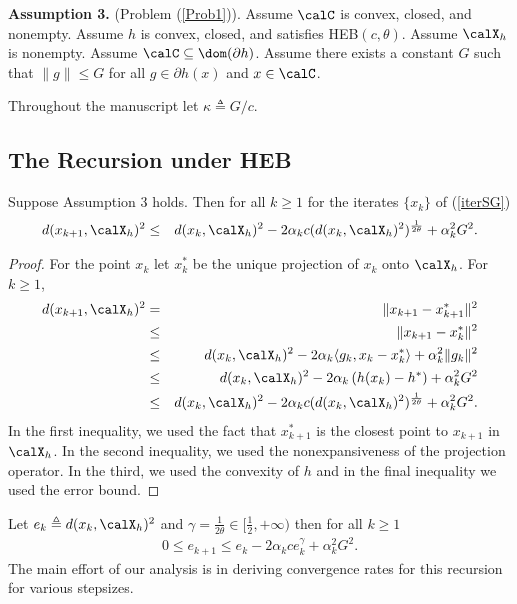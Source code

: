 \documentclass[smallextended]{svjour3}
\begin{document}
{\bf Assumption 3.} (Problem (\ref{Prob1})).
Assume $\calC$ is convex, closed, and nonempty. Assume $h$ is convex, closed, and satisfies HEB$(c,\theta)$. Assume $\calX_h$ is nonempty. Assume $\calC\subseteq\dom(\partial h)$. Assume there exists a constant $G$ such that $\|g\|\leq G$ for all $g\in\partial h(x)$ and $x\in\calC$. 

Throughout the manuscript let $\kappa\triangleq G/c$. 
\subsection{The Recursion under HEB}


 \begin{proposition}\label{Prop_keyRecur}
 Suppose Assumption 3 holds. Then for all $k\geq 1$ for the iterates $\{x_k\}$ of (\ref{iterSG})
 \begin{eqnarray}\label{KeyRecursion}
 d(x_{k+1},\calX_h)^2
 &\leq&
  d(x_k,\calX_h)^2
  -2\alpha_k c(d(x_k,\calX_h)^2)^{\frac{1}{2\theta}}
  +\alpha_k^2 G^2.
 \end{eqnarray}
 \end{proposition}
 \begin{proof}
 For the point $x_k$ let $x_k^*$ be the unique projection of $x_k$ onto $\calX_h$.  
 For $k\geq 1$,
 \begin{eqnarray}
 d(x_{k+1},\calX_h)^2
 &=&
 \|x_{k+1}-x_{k+1}^*\|^2
 \nonumber\\
 &\leq&
 \|x_{k+1}-x_k^*\|^2
 \nonumber\\\nonumber
 &\leq&
 d(x_k,\calX_h)^2
 -2\alpha_k\langle g_k,x_k - x_k^*\rangle
 +\alpha_k^2\|g_k\|^2
 \\\nonumber
 &\leq&
 d(x_k,\calX_h)^2
 -2\alpha_k\left(h(x_k)-h^*\right)
 +\alpha_k^2 G^2
 \\\nonumber
 &\leq&
 d(x_k,\calX_h)^2
 -2\alpha_k c(d(x_k,\calX_h)^2)^{\frac{1}{2\theta}}
 +\alpha_k^2 G^2.
 \end{eqnarray}
In the first inequality, we used the fact that $x_{k+1}^*$ is the closest point to $x_{k+1}$ in $\calX_h$. In the second inequality, we used the nonexpansiveness of the projection operator. In the third, we used the convexity of $h$ and in the final inequality we used the error bound. 
 \end{proof}
 
Let $e_k \triangleq d(x_k,\calX_h)^2$ and $\gamma=\frac{1}{2\theta}\in[\frac{1}{2},+\infty)$ then for all $k\geq 1$
 \begin{eqnarray}\label{ABiggy}
 0\leq e_{k+1}\leq e_k - 2\alpha_k c e_k^{\gamma} +\alpha_k^2 G^2.
 \end{eqnarray}
 The main effort of our analysis is in deriving convergence rates for this recursion for various stepsizes.
 
\end{document}
